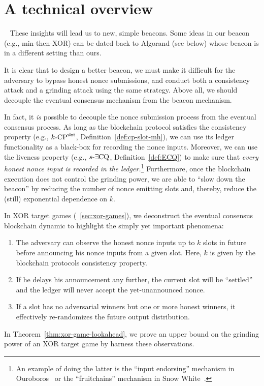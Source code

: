 \section{A technical overview}~
    These insights will lead us to new, simple beacons. 
    Some ideas in our beacon (e.g., min-then-XOR) can be dated back to Algorand (see below) 
    whose beacon is in a different setting than ours.

    It is clear that to design a better beacon, 
    we must make it difficult for the adversary to 
    bypass honest nonce submissions, 
    and conduct both a consistency attack and a grinding attack using the same strategy. 
    Above all, we should decouple the eventual consensus mechanism 
    from the beacon mechanism.

    In fact, it \emph{is} possible to decouple the nonce submission process from the eventual consensus process. 
    As long as the blockchain protocol satisfies the consistency property (e.g., ${k}\text{-}\mathrm{CP}^{\mathsf{slot}}$, Definition~\ref{def:cp-slot-mh}), 
    we can use its ledger functionality as a black-box for recording the nonce inputs. 
    Moreover, we can use the liveness property (e.g., ${s}\text{-}\exists\mathrm{CQ}$, Definition~\ref{def:ECQ}) 
    to make sure that \emph{every honest nonce input is recorded in the ledger.}\footnote{ 
        An example of doing the latter is the ``input endorsing'' mechanism in Ouroboros~\cite{Ouroboros} 
        or the ``fruitchains'' mechanism in Snow White~\cite{SnowWhite,Fruitchains}.
    }
    Furthermore, once the blockchain execution does not control the grinding power, 
    we are able to ``slow down the beacon'' by reducing the number of nonce emitting slots 
    and, thereby, reduce the (still) exponential dependence on $k$.

    In XOR target games (\Section~\ref{sec:xor-games}), 
    we deconstruct the eventual consensus blockchain dynamic 
    to highlight the simply yet important phenomena: 
    \begin{enumerate}
        \item The adversary can observe the honest nonce inputs up to $k$ slots in future 
        before announcing his nonce inputs from a given slot.
        Here, $k$ is given by the blockchain protocols consistency property.

        \item If he delays his announcement any further, the current slot will be ``settled'' 
        and the ledger will never accept the yet-unannounced nonce.

        \item If a slot has no adversarial winners but one or more honest winners, 
        it effectively re-randomizes the future output distribution.
    \end{enumerate}
    In Theorem~\ref{thm:xor-game-lookahead}, 
    we prove an upper bound on the grinding power of an XOR target game 
    by harness these observations.



